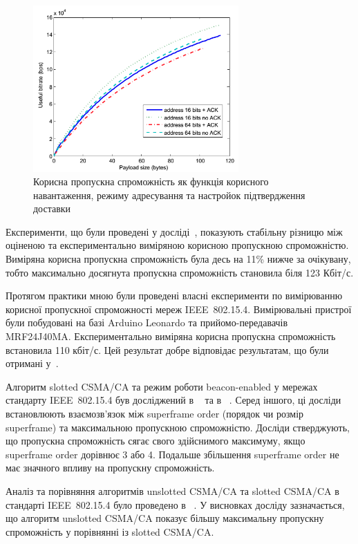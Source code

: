 \documentclass[a4paper,ukrainian,utf8,nocolumnsxix,floatsection,equationsection]{eskdtext}
\newcommand{\longcaption}[1]{\captionsetup{style=figureLongCaption}\caption{#1}}
\newcommand{\iee}[0]{IEEE~802.15.4\xspace}
\newcommand{\csma}[0]{CSMA/CA\xspace}
\newcommand{\ucsma}[0]{unslotted \csma\xspace}
\newcommand{\scsma}[0]{slotted \csma\xspace}
\newcommand{\bem}[0]{beacon-enabled\xspace}
\begin{document}
\begin{figure}[bth]
	\centering
	\includegraphics[width=0.7\textwidth]{img/throughput_graph.png}
	\longcaption{\label{fig:throughput_graph}Корисна пропускна спроможність як функція корисного навантаження, режиму адресування та настройок підтвердження доставки}
\end{figure}

Експерименти, що були проведені у досліді~\cite{thoroughput:analysis:unslotted:ieee}, показують стабільну різницю між оціненою та експериментально виміряною корисною пропускною спроможністю. Виміряна корисна пропускна спроможність була десь на 11\% нижче за очікувану, тобто максимально досягнута пропускна спроможність становила біля 123 Кбіт/с.

Протягом практики мною були проведені власні експерименти по вимірюванню корисної пропускної спроможності мереж \iee. Вимірювальні пристрої були побудовані на базі Arduino Leonardo та прийомо-передавачів MRF24J40MA. Експериментально виміряна корисна пропускна спроможність встановила 110 кбіт/с. Цей результат добре відповідає результатам, що були отримані у~\cite{thoroughput:analysis:unslotted:ieee}.

Алгоритм \scsma та режим роботи \bem у мережах стандарту \iee був досліджений в ~\cite{simulation:study:slotted:ieee} та в ~\cite{gts:allocation:analysis}. Серед іншого, ці досліди встановлюють взаємозв'язок між superframe order (порядок чи розмір superframe) та максимальною пропускною спроможністю. Досліди стверджують, що пропускна спроможність сягає свого здійснимого максимуму, якщо superframe order дорівнює 3 або 4. Подальше збільшення superframe order не має значного впливу на пропускну спроможність.

Аналіз та порівняння алгоритмів \ucsma та \scsma в стандарті \iee було проведено в ~\cite{analysis:slotted:unslotted}. У висновках досліду зазначається, що алгоритм \ucsma  показує більшу максимальну пропускну спроможність у порівнянні із \scsma.
\end{document}
